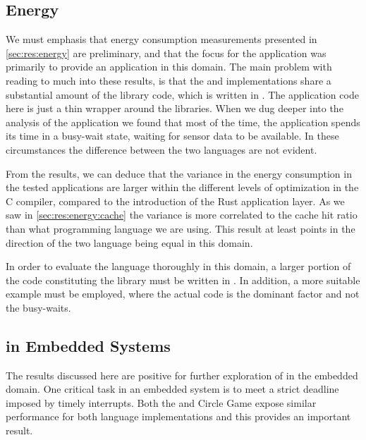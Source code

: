 \subsection{Energy}

We must emphasis that energy consumption measurements presented in \autoref{sec:res:energy} are preliminary, and that the focus for the {\tracker} application was primarily to provide an application in this domain.
The main problem with reading to much into these results, is that the {\rust} and {\C} implementations share a substantial amount of the library code, which is written in {\C}.
The application code here is just a thin wrapper around the libraries.
When we dug deeper into the analysis of the application we found that most of the time, the application spends its time in a busy-wait state, waiting for sensor data to be available.
In these circumstances the difference between the two languages are not evident.

From the results, we can deduce that the variance in the energy consumption in the tested applications are larger within the different levels of optimization in the C compiler, compared to the introduction of the Rust application layer.
As we saw in \autoref{sec:res:energy:cache} the variance is more correlated to the cache hit ratio than what programming language we are using.
This result at least points in the direction of the two language being equal in this domain.

In order to evaluate the {\rust} language thoroughly in this domain, a larger portion of the code constituting the library must be written in {\rust}.
In addition, a more suitable example must be employed, where the actual code is the dominant factor and not the busy-waits.

\subsection{{\rust} in Embedded Systems}

The results discussed here are positive for further exploration of {\rust} in the embedded domain.
One critical task in an embedded system is to meet a strict deadline imposed by timely interrupts.
Both the {\tracker} and Circle Game expose similar performance for both language implementations and this provides an important result.

